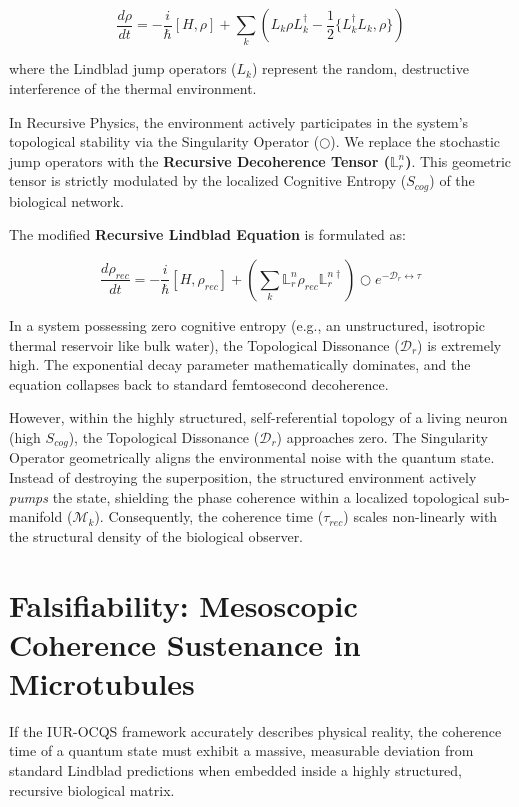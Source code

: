 \documentclass[12pt,openany]{book}
\begin{document}
\begin{equation}
\frac{d\rho}{dt} = -\frac{i}{\hbar}[H, \rho] + \sum_k \left( L_k \rho L_k^\dagger - \frac{1}{2} \{L_k^\dagger L_k, \rho\} \right)
\end{equation}

where the Lindblad jump operators ($L_k$) represent the random, destructive interference of the thermal environment.

In Recursive Physics, the environment actively participates in the system's topological stability via the Singularity Operator ($\bigcirc$). We replace the stochastic jump operators with the \textbf{Recursive Decoherence Tensor ($\mathbb{L}_r^n$)}. This geometric tensor is strictly modulated by the localized Cognitive Entropy ($S_{cog}$) of the biological network. 

The modified \textbf{Recursive Lindblad Equation} is formulated as:

\begin{equation}
\frac{d\rho_{rec}}{dt} = -\frac{i}{\hbar}[H, \rho_{rec}] + \left( \sum_k \mathbb{L}_r^n \rho_{rec} \mathbb{L}_r^{n \dagger} \right) \bigcirc e^{-\mathcal{D}_r \leftrightarrow\tau}
\end{equation}

In a system possessing zero cognitive entropy (e.g., an unstructured, isotropic thermal reservoir like bulk water), the Topological Dissonance ($\mathcal{D}_r$) is extremely high. The exponential decay parameter mathematically dominates, and the equation collapses back to standard femtosecond decoherence. 

However, within the highly structured, self-referential topology of a living neuron (high $S_{cog}$), the Topological Dissonance ($\mathcal{D}_r$) approaches zero. The Singularity Operator geometrically aligns the environmental noise with the quantum state. Instead of destroying the superposition, the structured environment actively \textit{pumps} the state, shielding the phase coherence within a localized topological sub-manifold ($\mathcal{M}_k$). Consequently, the coherence time ($\tau_{rec}$) scales non-linearly with the structural density of the biological observer.

\section{Falsifiability: Mesoscopic Coherence Sustenance in Microtubules}
If the IUR-OCQS framework accurately describes physical reality, the coherence time of a quantum state must exhibit a massive, measurable deviation from standard Lindblad predictions when embedded inside a highly structured, recursive biological matrix.
\end{document}
